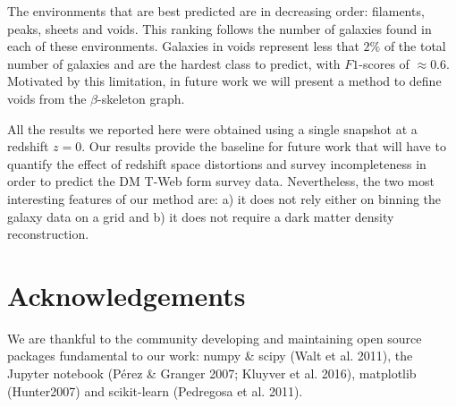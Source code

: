 \documentclass[usenatbib]{mnras}
\begin{document}
The environments that are best predicted are in decreasing order: 
filaments, peaks, sheets and voids. 
This ranking follows the number of galaxies found in each of these environments.
Galaxies in voids represent less that $2\%$ of the total number of galaxies and 
are the hardest class to predict, with $F1$-scores of $\approx0.6$.
Motivated by this limitation, in future work we will present a method to define
voids from the $\beta$-skeleton graph.

All the results we reported here were obtained using a single snapshot at a 
redshift $z=0$.
Our results provide the baseline for future work that will have to quantify 
the effect of redshift space distortions and survey incompleteness in order to
predict  the DM T-Web form survey data.
Nevertheless, the two most interesting features of our method are: a) it does not
rely either on binning the galaxy data on a grid and b) it does not require a dark matter density reconstruction.



\section*{Acknowledgements}

We are thankful to the community developing and maintaining open source packages fundamental to our work: numpy
\&  scipy  (Walt  et  al.  2011),  the  Jupyter  notebook  (P\'erez \& Granger 2007; Kluyver et al. 2016), matplotlib (Hunter2007) and  scikit-learn (Pedregosa et al. 2011).






\bsp	%
\label{lastpage}
\end{document}
